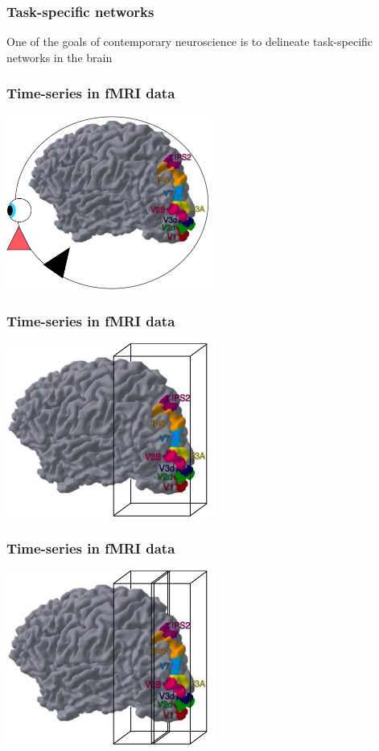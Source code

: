 \documentclass{beamer}
\begin{document}
\begin{frame}
\frametitle{Task-specific networks}
  One of the goals of contemporary neuroscience is to delineate task-specific
  networks in the brain
\end{frame}

\begin{frame}
\frametitle{Time-series in fMRI data}
\includegraphics[height=5.7cm]{figures/brain_w_head}
\end{frame}

\begin{frame}
\frametitle{Time-series in fMRI data}
\includegraphics[height=5.7cm]{figures/brain_w_acquisition_vol}
\end{frame}

\begin{frame}
\frametitle{Time-series in fMRI data}
\includegraphics[height=5.7cm]{figures/brain_w_acquisition_vol_n_slice}
\end{frame}
\end{document}
